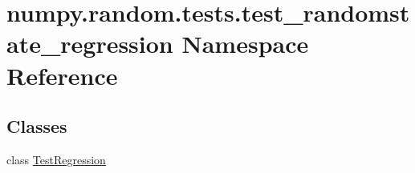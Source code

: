 \hypertarget{namespacenumpy_1_1random_1_1tests_1_1test__randomstate__regression}{}\section{numpy.\+random.\+tests.\+test\+\_\+randomstate\+\_\+regression Namespace Reference}
\label{namespacenumpy_1_1random_1_1tests_1_1test__randomstate__regression}
\subsection*{Classes}
\begin{DoxyCompactItemize}
\item 
class \hyperlink{classnumpy_1_1random_1_1tests_1_1test__randomstate__regression_1_1TestRegression}{Test\+Regression}
\end{DoxyCompactItemize}
